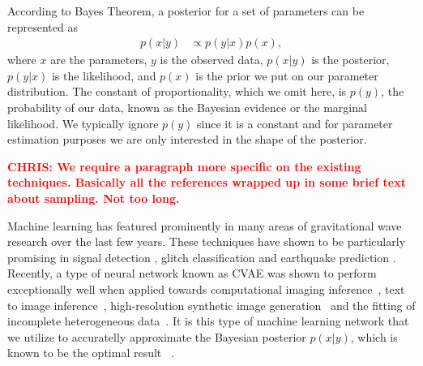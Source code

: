 \documentclass[%
showpacs,
 amsmath,amssymb,
 aps,
 twocolumn,
 prl,
 reprint,
floatfix,
]{revtex4-1}
\newcommand{\chris}[1]{\textbf{\textcolor{red}{CHRIS: #1}}}
\begin{document}
%
%
According to Bayes Theorem, a posterior for a set of parameters can be
represented as
%
\begin{align}\label{eq:bayes_theorem}
    p(x|y) &\propto p(y|x) p(x),
\end{align}
%
where $x$ are the parameters, $y$ is the observed data, $p(x|y)$ is the
posterior, $p(y|x)$ is the likelihood, and $p(x)$ is the prior we put on our
parameter distribution. The constant of proportionality, which we omit here, is
$p(y)$, the probability of our data, known as the Bayesian evidence or the
marginal likelihood. We typically ignore $p(y)$ since it is a constant and for
parameter estimation purposes we are only interested in the shape of the
posterior.
 
\chris{We require a paragraph more specific on the existing techniques.
Basically all the references wrapped up in some brief text about sampling. Not
too long.}
  
%
%
Machine learning has featured prominently in many areas of gravitational wave
research over the last few years. These techniques have shown to be
particularly promising in signal detection
\cite{GEORGE201864,PhysRevLett.120.141103,1904.08693}, glitch classification
\cite{1706.07446,0264-9381-34-6-064003} and earthquake prediction
\cite{Coughlin_2017}. Recently, a type of neural network known as \ac{CVAE} was
shown to perform exceptionally well when applied towards computational imaging
inference~\cite{1904.06264,NIPS2015_5775}, text to image
inference~\cite{1512.00570}, high-resolution synthetic image
generation~\cite{1612.00005} and the fitting of incomplete heterogeneous
data~\cite{1807.03653}. It is this type of machine learning network that we
utilize to accuratelly approximate the Bayesian posterior $p(x|y)$, which is
known to be the optimal result ~\cite{0809.2809}.
\end{document}
